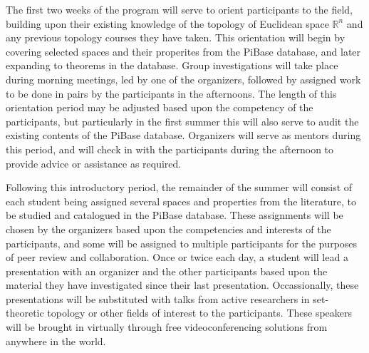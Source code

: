   The first two weeks of the program will serve to orient participants
  to the field, building upon their existing knowledge of the topology of
  Euclidean space \(\mathbb R^n\) and any previous topology courses they
  have taken. This orientation will begin by covering selected
  spaces and their properites from the PiBase database,
  and later expanding to theorems in the database. Group investigations will
  take place during morning meetings, led by one of the organizers, followed
  by assigned work to be done in pairs by the participants in the afternoons.
  The length of this orientation period may be adjusted based upon the
  competency of the participants, but particularly in the first summer this
  will also serve to audit the existing contents of the PiBase database.
  Organizers will serve as mentors during this period, and will check in
  with the participants during the afternoon to provide advice or assistance
  as required.

  Following this introductory period, the remainder of the summer will
  consist of each student being assigned several spaces and properties
  from the literature,
  to be studied and catalogued in the PiBase database. These assignments
  will be chosen by the organizers
  based upon the competencies and interests of the participants, and some
  will be assigned to multiple participants for the purposes of peer review
  and collaboration. Once or twice each day,
  a student will lead a presentation with an
  organizer and the other participants based upon the material they have
  investigated since their last presentation. Occassionally, these presentations
  will be substituted with talks from active researchers in set-theoretic topology
  or other fields of interest to the participants. These speakers will
  be brought in virtually through free
  videoconferencing solutions from anywhere in the world.

